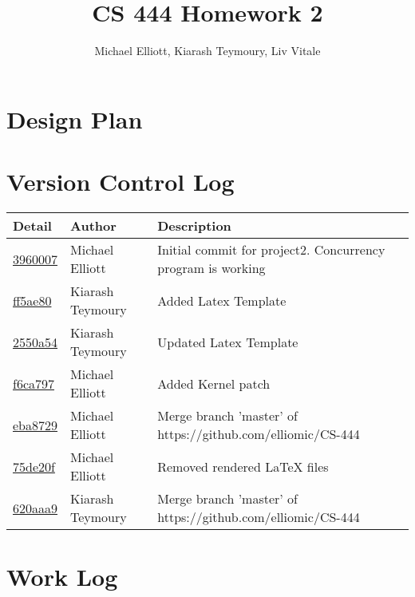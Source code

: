 {\bf }\documentclass[letterpaper,10pt,titlepage,draftclsnofoot,onecolumn]{IEEEtran}
\title{CS 444 Homework 2}
\author{Michael Elliott, Kiarash Teymoury, Liv Vitale}
\begin{document}
\section{Design Plan}


\section{Version Control Log}

\begin{tabular}{l l l}\textbf{Detail} & \textbf{Author} & \textbf{Description}\\\hline
\href{https://github.com/elliomic/CS-444/commit/3960007dcd2e09104c3b8163b326ba635a00fe25}{3960007} & Michael Elliott & Initial commit for project2. Concurrency program is working\\\hline
\href{https://github.com/elliomic/CS-444/commit/ff5ae8022f9a2cb63b4174945bec1f7ec3d67d77}{ff5ae80} & Kiarash Teymoury & Added Latex Template\\\hline
\href{https://github.com/elliomic/CS-444/commit/2550a5434d0e99148462ae4c27ee47d6649e1f84}{2550a54} & Kiarash Teymoury & Updated Latex Template\\\hline
\href{https://github.com/elliomic/CS-444/commit/f6ca797f7076ba4a3f300e6e777f1ff3dd782a0b}{f6ca797} & Michael Elliott & Added Kernel patch\\\hline
\href{https://github.com/elliomic/CS-444/commit/eba8729a916481d064ded4e5d0a9bc6aca866996}{eba8729} & Michael Elliott & Merge branch 'master' of https://github.com/elliomic/CS-444\\\hline
\href{https://github.com/elliomic/CS-444/commit/75de20f36af8f4e47207e25020e866469c3df88a}{75de20f} & Michael Elliott & Removed rendered LaTeX files\\\hline
\href{https://github.com/elliomic/CS-444/commit/620aaa92bd40125290c7e8fea12d804613227c1e}{620aaa9} & Kiarash Teymoury & Merge branch 'master' of https://github.com/elliomic/CS-444\\\hline
\hline\end{tabular}


\section{Work Log}
\end{document}
